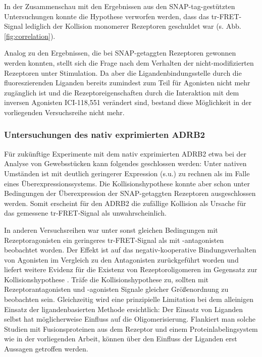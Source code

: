 In der Zusammenschau mit den Ergebnissen aus den SNAP-tag-gestützten Untersuchungen konnte die Hypothese verworfen werden, dass das tr-FRET-Signal lediglich der Kollision monomerer Rezeptoren geschuldet war (s. Abb. \ref{fig:correlation}).

Analog zu den Ergebnissen, die bei SNAP-getaggten Rezeptoren gewonnen werden konnten, stellt sich die Frage nach dem Verhalten der nicht-modifizierten Rezeptoren unter Stimulation. Da aber die Ligandenbindungsstelle durch die fluoreszierenden Liganden bereits zumindest zum Teil für Agonisten nicht mehr zugänglich ist und die Rezeptoreigenschaften durch die Interaktion mit dem inversen Agonisten ICI-118,551 verändert sind, bestand diese Möglichkeit in der vorliegenden Versuchsreihe nicht mehr.

\subsubsection{Untersuchungen des nativ exprimierten ADRB2}

Für zukünftige Experimente mit dem nativ exprimierten ADRB2 etwa bei der Analyse von Gewebsstücken kann folgendes geschlossen werden: Unter nativen Umständen ist mit deutlich geringerer Expression (s.u.) zu rechnen als im Falle eines Überexpressionssystems. Die Kollisionshypothese konnte aber schon unter Bedingungen der Überexpression der SNAP-getaggten Rezeptoren ausgeschlossen werden. Somit erscheint für den ADRB2 die zufällige Kollision als Ursache für das gemessene tr-FRET-Signal als unwahrscheinlich.

In anderen Versuchsreihen war unter sonst gleichen Bedingungen mit Rezeptoragonisten ein geringeres tr-FRET-Signal als mit -antagonisten beobachtet worden. Der Effekt ist auf das negativ-kooperative Bindungsverhalten von Agonisten im Vergleich zu den Antagonisten zurückgeführt worden und liefert weitere Evidenz für die Existenz von Rezeptoroligomeren im Gegensatz zur Kollisionshypothese \parencite{Cottet2012a}. Träfe die Kollisionshypothese zu, sollten mit Rezeptorantagonisten und -agonisten Signale gleicher Größenordnung zu beobachten sein. Gleichzeitig wird eine prinzipielle Limitation bei dem alleinigen Einsatz der ligandenbasierten Methode ersichtlich: Der Einsatz von Liganden selbst hat möglicherweise Einfluss auf die Oligomerisierung. Flankiert man solche Studien mit Fusionsproteinen aus dem Rezeptor und einem Proteinlabelingsystem wie in der vorliegenden Arbeit, können über den Einfluss der Liganden erst Aussagen getroffen werden.

